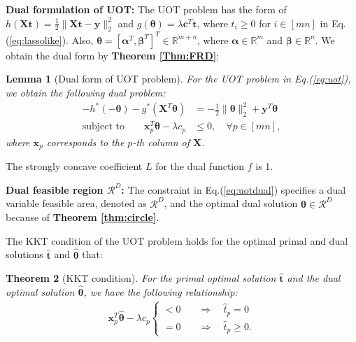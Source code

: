 \documentclass[twoside]{article}
\theoremstyle{plain}
\newtheorem{thm}{Theorem}
\newtheorem{lem}[thm]{Lemma}
\newcommand{\R}{\mathbb{R}}
\newcommand{\mat}[1]{\mathbf{#1}}
\renewcommand{\vec}[1]{\bm{#1}}
\begin{document}
{\bf Dual formulation of UOT:} The UOT problem has the form of
$h(\mat{X} \vec{t}) = \frac{1}{2}\|\mat{X} \vec{t}-\vec{y}\|_2^2$ and $g(\vec{\theta})=\lambda \vec{c}^{T}\vec{t}$, where $t_i \geq 0$ for $i \in [mn]$ in Eq.(\ref{eq:lassolike}). Also, $\vec{\theta} = [\vec{\alpha}^T,\vec{\beta}^T]^T \in \mathbb{R}^{m+n}$, where $\vec{\alpha}\in\R^{m}$ and $\vec{\beta}\in\R^{n}$. We obtain the dual form by {\bf Theorem \ref{Thm:FRD}}:
\begin{lem}[Dual form of UOT problem]
For the UOT problem in Eq.(\ref{eq:uot}), we obtain the following dual problem:
\begin{equation}
\begin{split}
-h^*(-\vec{\theta}) - g^*(\mat{X}^T\vec{\theta})& = -\frac{1}{2}\|\vec{\theta}\|_2^2+\vec{y}^T\vec{\theta} \\
\text{subject\ to} \quad \quad \vec{x}_p^T\vec{\theta} -\lambda c_p &\leq 0, \quad \forall p \in [mn],
\end{split}
\label{eq:uotdual}
\end{equation}
where $\vec{x}_p $ corresponds to the $p$-th column of $\mat{X}$.
\end{lem}
The strongly concave coefficient $L$ for the dual function $f$ is 1. 

{\bf Dual feasible region $\mathcal{R}^D$:} 
The constraint in Eq.(\ref{eq:uotdual}) specifies a dual variable feasible area, denoted as $\mathcal{R}^{D}$, and the optimal dual solution $\hat{\vec{\theta}} \in \mathcal{R}^{D}$ because of {\bf Theorem \ref{thm:circle}}.

The KKT condition of the UOT problem holds for the optimal primal and dual solutions $ \hat{\vec{t}}$ and $\hat{\vec{\theta}}$ that:
\begin{thm}[KKT condition] For the primal optimal solution $\hat{\vec{t}}$ and the dual optimal solution $\hat{\vec{\theta}}$, we have the following relationship:
 \begin{equation}
\begin{split}
\vec{x}_p^T\hat{\vec{\theta}} -\lambda c_p \left\{
\begin{aligned}
< 0 \quad& \Longrightarrow \quad\hat{t}_p = 0\\
= 0 \quad& \Longrightarrow \quad\hat{t}_p \geq 0.
\end{aligned}
\right.
 \end{split}
 \label{eq:kkt}
\end{equation}
\end{thm}
\end{document}
